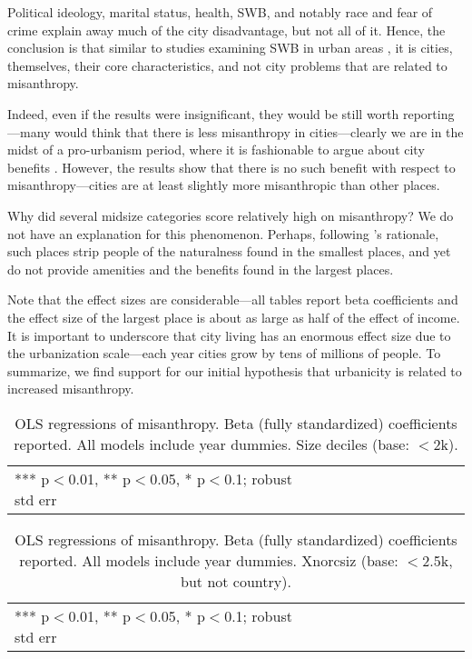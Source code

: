 \documentclass[11pt, letterpaper]{article}
\begin{document}
\begin{spacing}{1.4}
Political ideology, marital status, health, SWB, and notably race and fear of crime explain away much of the city disadvantage, but not all of it. Hence, the
conclusion is that similar to studies examining SWB in urban areas \citep{aok_brfss_city_cize16}, it is cities, themselves, their core characteristics, and not city problems that are related to misanthropy. 

Indeed, even if the results were insignificant, they would be still worth reporting---many would think that there is less misanthropy in cities---clearly
we are in the midst of a pro-urbanism period, where it is fashionable to argue about city benefits \citep[e.g.,][]{glaeser11}. However, the results show that there is no such benefit with respect to misanthropy---cities are at least slightly more misanthropic than other places.

Why did several midsize categories score relatively high on misanthropy? We do not have an explanation for this phenomenon. Perhaps, following \citet{aok-ls_fisher16}'s rationale, such places strip people of the naturalness found in the smallest places, and yet do not provide amenities and the benefits found in the largest places.

Note that the effect sizes are considerable---all tables report beta coefficients
and the effect size of the largest place is about as large as half of the effect
of income. It is important to underscore that city living has an enormous effect size due to the urbanization scale---each year cities
grow by tens of millions of people. To summarize, we find support for our initial hypothesis that urbanicity is related to increased misanthropy. 

\begin{table}[H]\centering
\caption{OLS regressions  of misanthropy. Beta (fully standardized) coefficients
  reported. All models include year dummies. Size deciles (base: $<$2k).} \label{regA}
\begin{scriptsize} \begin{tabular}{p{1.8in}p{.45in}p{.45in}p{.45in}p{.45in}p{.45in}p{.45in}p{.45in}p{.45in}p{.45in}p{.45 in}}\hline

\hline  *** p$<$0.01, ** p$<$0.05, * p$<$0.1; robust std err
\end{tabular}\end{scriptsize}\end{table}

\begin{table}[H]\centering
\caption{OLS regressions  of misanthropy. Beta (fully standardized) coefficients
  reported. All models include year dummies.  Xnorcsiz (base: $<$2.5k, but not country).} \label{regB}
\begin{scriptsize} \begin{tabular}{p{1.8in}p{.45in}p{.45in}p{.45in}p{.45in}p{.45in}p{.45in}p{.45in}p{.45in}p{.45in}p{.45 in}}\hline

\hline  *** p$<$0.01, ** p$<$0.05, * p$<$0.1; robust std err
\end{tabular}\end{scriptsize}\end{table}


\end{spacing}
\end{document}
